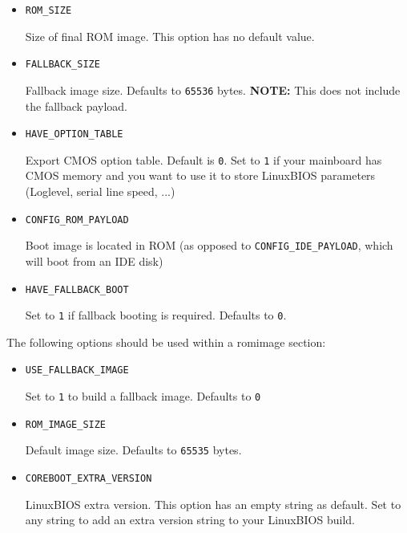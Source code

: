 \documentclass[titlepage,12pt]{article}
\begin{document}
\begin{itemize}
\item \begin{verbatim}ROM_SIZE\end{verbatim}

Size of final ROM image. This option has no default value.

\item \begin{verbatim}FALLBACK_SIZE\end{verbatim}

Fallback image size. Defaults to \texttt{65536} bytes. \textbf{NOTE:} 
This does not include the fallback payload.

\item \begin{verbatim}HAVE_OPTION_TABLE\end{verbatim}

Export CMOS option table. Default is \texttt{0}. Set to \texttt{1} if
your mainboard has CMOS memory and you want to use it to store
LinuxBIOS parameters (Loglevel, serial line speed, ...)

\item \begin{verbatim}CONFIG_ROM_PAYLOAD\end{verbatim}

Boot image is located in ROM (as opposed to \texttt{CONFIG\_IDE\_PAYLOAD}, which
will boot from an IDE disk)

\item \begin{verbatim}HAVE_FALLBACK_BOOT\end{verbatim}

Set to \texttt{1} if fallback booting is required. Defaults to
\texttt{0}.

\end{itemize}


The following options should be used within a romimage section:

\begin{itemize}

\item \begin{verbatim}USE_FALLBACK_IMAGE\end{verbatim}

Set to \texttt{1} to build a fallback image. Defaults to \texttt{0}

\item \begin{verbatim}ROM_IMAGE_SIZE\end{verbatim}

Default image size. Defaults to \texttt{65535} bytes.

\item \begin{verbatim}COREBOOT_EXTRA_VERSION\end{verbatim}

LinuxBIOS extra version. This option has an empty string as default. Set
to any string to add an extra version string to your LinuxBIOS build.

\end{itemize}
\end{document}
